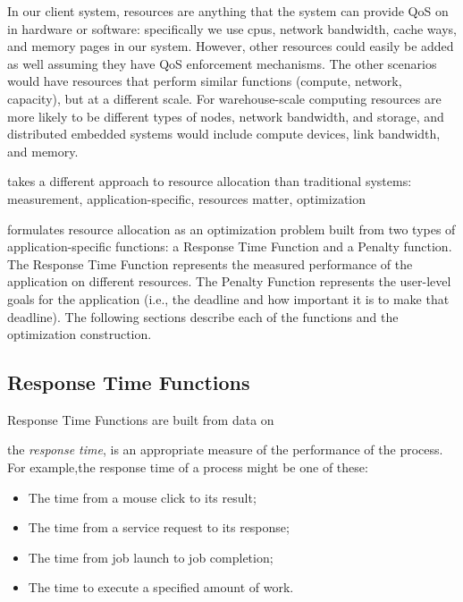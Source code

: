 
In our client system, resources are anything that the system can provide QoS on in hardware or software: specifically we use cpus, network bandwidth, cache ways, and memory pages in our system.  However, other resources could easily be added as well assuming they have QoS enforcement mechanisms.  The other scenarios would have resources that perform similar functions (compute, network, capacity), but at a different scale. For warehouse-scale computing resources are more likely to be different types of nodes, network bandwidth, and storage, and distributed embedded systems would include compute devices, link bandwidth, and memory.   

 
\pacora takes a different approach to resource allocation than traditional systems: measurement, application-specific, resources matter, optimization 


\pacora formulates resource allocation as an optimization problem built from two types of application-specific functions: a Response Time Function and a Penalty function. The Response Time Function represents the measured performance of the application on different resources.  The Penalty Function represents the user-level goals for the application (i.e., the deadline and how important it is to make that deadline). The following sections describe each of the functions and the optimization construction.

\subsection*{Response Time Functions}

Response Time Functions are built from data on 

 the \emph{response time},
    is an appropriate measure of the performance of the process.
    For example,the response time of a process might be one of these:
    \begin{itemize}[noitemsep]
    \item The time from a mouse click to its result;
    \item The time from a service request to its response;
    \item The time from job launch to job completion;
    \item The time to execute a specified amount of work.
    \end{itemize}

